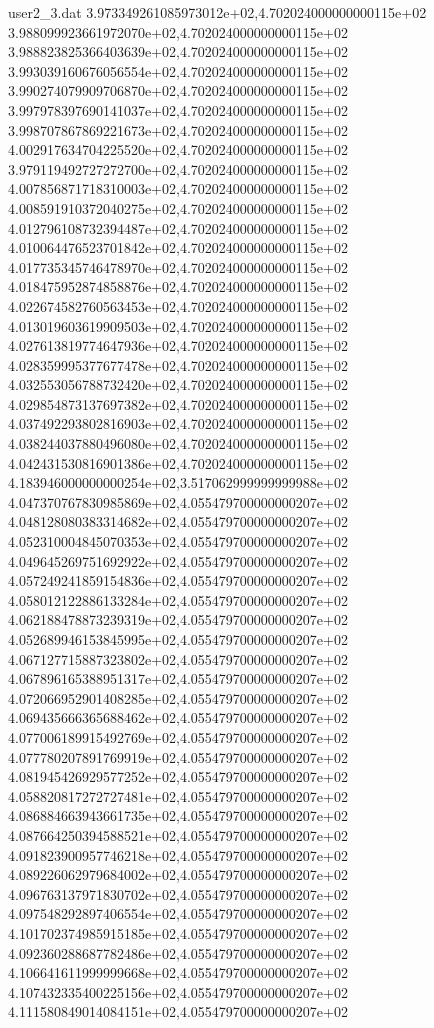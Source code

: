 \begin{filecontents}{user2_3.dat}
3.973349261085973012e+02,4.702024000000000115e+02
3.988099923661972070e+02,4.702024000000000115e+02
3.988823825366403639e+02,4.702024000000000115e+02
3.993039160676056554e+02,4.702024000000000115e+02
3.990274079909706870e+02,4.702024000000000115e+02
3.997978397690141037e+02,4.702024000000000115e+02
3.998707867869221673e+02,4.702024000000000115e+02
4.002917634704225520e+02,4.702024000000000115e+02
3.979119492727272700e+02,4.702024000000000115e+02
4.007856871718310003e+02,4.702024000000000115e+02
4.008591910372040275e+02,4.702024000000000115e+02
4.012796108732394487e+02,4.702024000000000115e+02
4.010064476523701842e+02,4.702024000000000115e+02
4.017735345746478970e+02,4.702024000000000115e+02
4.018475952874858876e+02,4.702024000000000115e+02
4.022674582760563453e+02,4.702024000000000115e+02
4.013019603619909503e+02,4.702024000000000115e+02
4.027613819774647936e+02,4.702024000000000115e+02
4.028359995377677478e+02,4.702024000000000115e+02
4.032553056788732420e+02,4.702024000000000115e+02
4.029854873137697382e+02,4.702024000000000115e+02
4.037492293802816903e+02,4.702024000000000115e+02
4.038244037880496080e+02,4.702024000000000115e+02
4.042431530816901386e+02,4.702024000000000115e+02
4.183946000000000254e+02,3.517062999999999988e+02
4.047370767830985869e+02,4.055479700000000207e+02
4.048128080383314682e+02,4.055479700000000207e+02
4.052310004845070353e+02,4.055479700000000207e+02
4.049645269751692922e+02,4.055479700000000207e+02
4.057249241859154836e+02,4.055479700000000207e+02
4.058012122886133284e+02,4.055479700000000207e+02
4.062188478873239319e+02,4.055479700000000207e+02
4.052689946153845995e+02,4.055479700000000207e+02
4.067127715887323802e+02,4.055479700000000207e+02
4.067896165388951317e+02,4.055479700000000207e+02
4.072066952901408285e+02,4.055479700000000207e+02
4.069435666365688462e+02,4.055479700000000207e+02
4.077006189915492769e+02,4.055479700000000207e+02
4.077780207891769919e+02,4.055479700000000207e+02
4.081945426929577252e+02,4.055479700000000207e+02
4.058820817272727481e+02,4.055479700000000207e+02
4.086884663943661735e+02,4.055479700000000207e+02
4.087664250394588521e+02,4.055479700000000207e+02
4.091823900957746218e+02,4.055479700000000207e+02
4.089226062979684002e+02,4.055479700000000207e+02
4.096763137971830702e+02,4.055479700000000207e+02
4.097548292897406554e+02,4.055479700000000207e+02
4.101702374985915185e+02,4.055479700000000207e+02
4.092360288687782486e+02,4.055479700000000207e+02
4.106641611999999668e+02,4.055479700000000207e+02
4.107432335400225156e+02,4.055479700000000207e+02
4.111580849014084151e+02,4.055479700000000207e+02

\end{filecontents}
